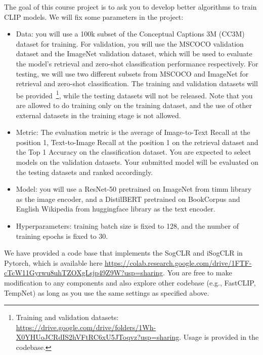 \documentclass{article}
\begin{document}
The goal of this course project is to ask you to develop better algorithms to train CLIP models.   We will fix some parameters in the project:
\begin{itemize}
  \item Data: you will use a 100k subset of the Conceptual Captions 3M (CC3M) dataset for training. For validation, you will use the MSCOCO validation dataset and the ImageNet validation dataset, which will be used to evaluate the model's retrieval and zero-shot classification performance respectively. For testing, we will use two different subsets from MSCOCO and ImageNet for retrieval and zero-shot classification. The training and validation datasets will be provided~\footnote{Training and validation datasets: \url{https://drive.google.com/drive/folders/1Wh-X0YHUoJCRdIS2hVFtRC6xU5JToqvz?usp=sharing}. Usage is provided in the codebase.}, while the testing datasets will not be released. Note that you are allowed to do training only on the training dataset, and the use of other external datasets  in the training stage is not allowed.
  \item Metric: The evaluation metric is the average of Image-to-Text Recall at the position 1, Text-to-Image Recall at the position 1 on the retrieval dataset and the Top 1 Accuracy on the classification dataset. You are expected to select models on the validation datasets. Your submitted model will be evaluated on the testing datasets and ranked accordingly.
  \item Model: you will use a ResNet-50 \cite{he2016deep} pretrained on ImageNet from timm library \cite{rw2019timm} as the image encoder, and a DistilBERT \cite{sanh2019distilbert} pretrained on BookCorpus \cite{Zhu_2015_ICCV} and English Wikipedia from huggingface library \cite{wolf-etal-2020-transformers} as the text encoder.
  \item Hyperparameters: training batch size is fixed to 128, and the number of training epochs is fixed to 30.
\end{itemize}


We have provided a code base that implements the SogCLR  and iSogCLR in Pytorch, which is available here \url{https://colab.research.google.com/drive/1FTF-cTcW11Gyrwu8uhTZOXgLsjp49Z9W?usp=sharing}. You are free to make modification to any components and also explore other codebase  (e.g., FastCLIP, TempNet)  as long as you use the same settings as specified above. 
\end{document}
